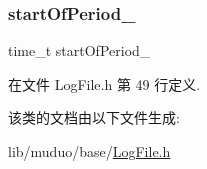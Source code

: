 \subsubsection{\texorpdfstring{start\+Of\+Period\+\_\+}{startOfPeriod\_}}
{\footnotesize\ttfamily time\+\_\+t start\+Of\+Period\+\_\+\hspace{0.3cm}{\ttfamily [private]}}



在文件 Log\+File.\+h 第 49 行定义.



该类的文档由以下文件生成\+:\begin{DoxyCompactItemize}
\item 
lib/muduo/base/\hyperlink{LogFile_8h}{Log\+File.\+h}\end{DoxyCompactItemize}
